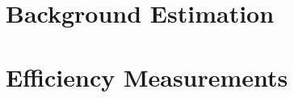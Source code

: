 \documentclass{cmspaper}
\begin{document}
\section{Background Estimation}

\section{Efficiency Measurements}
\end{document}
